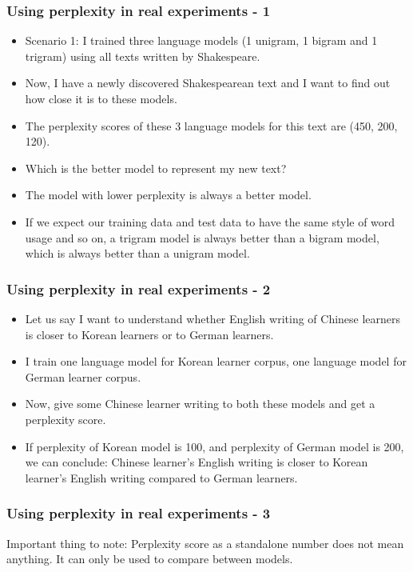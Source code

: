 \documentclass{beamer}
\begin{document}
\begin{frame}
\frametitle{Using perplexity in real experiments - 1}
\begin{itemize}
\item Scenario 1: I trained three language models  (1 unigram, 1 bigram and 1 trigram) using all texts written by Shakespeare. 
\item Now, I have a newly discovered Shakespearean text and I want to find out how close it is to these models. 
\item The perplexity scores of these 3 language models for this text are (450, 200, 120).
\item Which is the better model to represent my new text? \pause
\item The model with lower perplexity is always a better model.
\item If we expect our training data and test data to have the same style of word usage and so on, a trigram model is always better than a bigram model, which is always better than a unigram model.
\end{itemize}
\end{frame}

\begin{frame}
\frametitle{Using perplexity in real experiments - 2}
\begin{itemize}
\item Let us say I want to understand whether English writing of Chinese learners is closer to Korean learners or to German learners.
\item I train one language model for Korean learner corpus, one language model for German learner corpus.
\item Now, give some Chinese learner writing to both these models and get a perplexity score.
\item If perplexity of Korean model is 100, and perplexity of German model is 200, we can conclude: Chinese learner's English writing is closer to Korean learner's English writing compared to German learners. 
\end{itemize}
\end{frame}

\begin{frame}
\frametitle{Using perplexity in real experiments - 3}
Important thing to note: Perplexity score as a standalone number does not mean anything. It can only be used to compare between models. 
\end{frame}
\end{document}
